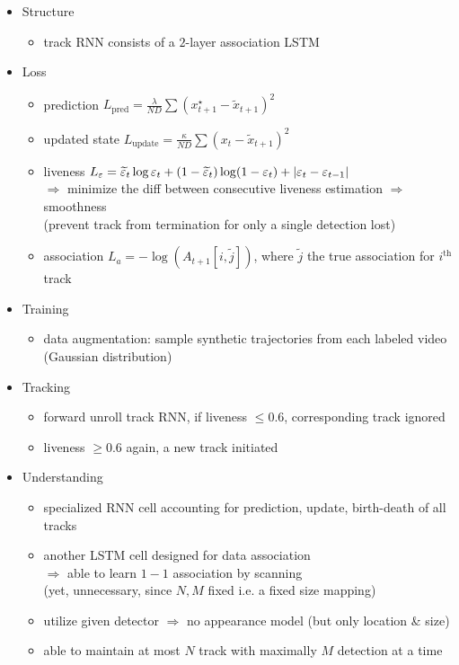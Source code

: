 \begin{itemize}
\begin{itemize}
\begin{itemize}
		\end{itemize}
	\item Structure
		\begin{itemize}
		\item track RNN consists of a $2$-layer association LSTM
		\end{itemize}
	\item Loss
		\begin{itemize}
		\item prediction $L_\text{pred} = \frac \lambda {ND} \sum (x^\star_{t+1} - \widetilde x_{t+1})^2$
		\item updated state $L_\text{update} = \frac \kappa {ND} \sum (x_{t} - \widetilde x_{t+1})^2$
		\item liveness $L_\varepsilon = \widetilde \varepsilon_t\log\varepsilon_t + (1-\widetilde \varepsilon_t)\log(1-\varepsilon_t) + \lvert\varepsilon_t - \varepsilon_{t-1}\rvert$ \\
		$\Rightarrow$ minimize the diff between consecutive liveness estimation $\Rightarrow$ smoothness \\
		(prevent track from termination for only a single detection lost)
		\item association $L_a = -\log(A_{t+1}[i,\widetilde{j}])$, where $\widetilde{j}$ the true association for $i^\text{th}$ track
		\end{itemize}
	\item Training
		\begin{itemize}
		\item data augmentation: sample synthetic trajectories from each labeled video \\
		(Gaussian distribution)
		\end{itemize}
	\item Tracking
		\begin{itemize}
		\item forward unroll track RNN, if liveness $\le0.6$, corresponding track ignored
		\item liveness $\ge0.6$ again, a new track initiated
		\end{itemize}
	\item Understanding
		\begin{itemize}
		\item specialized RNN cell accounting for prediction, update, birth-death of all tracks
		\item another LSTM cell designed for data association \\
		$\Rightarrow$ able to learn $1-1$ association by scanning \\
		(yet, unnecessary, since $N,M$ fixed i.e. a fixed size mapping)
		\item utilize given detector $\Rightarrow$ no appearance model (but only location \& size)
		\item able to maintain at most $N$ track with maximally $M$ detection at a time
		\end{itemize}
	\end{itemize}


\end{itemize}

